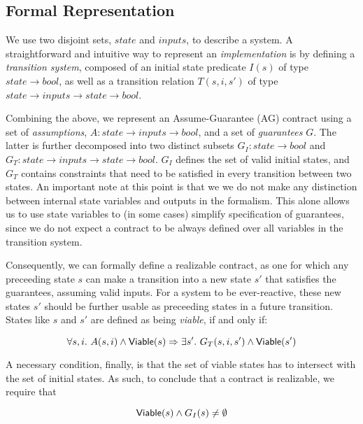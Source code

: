 \subsection{Formal Representation}
\label{sec:formals}
We use two disjoint sets, $state$ and $inputs$, to describe a system.
A straightforward and intuitive way to represent an \emph{implementation} is by
defining a \emph{transition system}, composed of an initial state
predicate $I(s)$ of type $state \to bool$, as well as a transition relation
$T(s,i,s')$ of type $state \to inputs \to state \to bool$.

Combining the above, we represent an Assume-Guarantee (AG) contract using a set
of \emph{assumptions}, $A: state \rightarrow inputs \rightarrow bool$,
and a set of \emph{guarantees} $G$. The latter is further decomposed into two
distinct subsets $G_I: state \rightarrow bool$ and $G_T: state \rightarrow
inputs \rightarrow state \rightarrow bool$. $G_I$ defines the set of valid
initial states, and $G_T$ contains constraints that need to be satisfied in
every transition between two states. An important note at this point is that we
we do not make any distinction between internal state variables and outputs in the
formalism. This alone allows us to use state variables to (in some cases)
simplify specification of guarantees, since we do not expect a contract
to be always defined over all variables in the transition system.

Consequently, we can formally define a realizable contract, as one for which any
preceeding state $s$ can make a transition into a new state $s'$ that satisfies
the guarantees, assuming valid inputs. For a system to be ever-reactive, these
new states $s'$ should be further usable as preceeding states in a future
transition. States like $s$ and $s'$ are defined as being \textit{viable}, if
and only if:

\begin{equation}
\forall s,i.~ A(s, i) \land {\mathsf {Viable}}(s) \Rightarrow \exists s'.~ G_T(s, i,s')
\land {\mathsf {Viable}}(s')
\label{eq:viable}
\end{equation}

A necessary condition, finally, is that the set of viable states has to
intersect with the set of initial states. As such, to conclude that a contract
is realizable, we require that

\begin{equation}
{\mathsf {Viable}}(s) \land G_I(s) \neq \emptyset
\label{eq:nonempty}
\end{equation}

